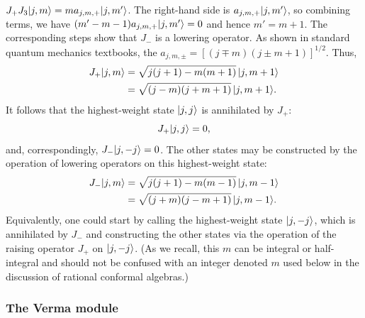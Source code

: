 $J_+J_3\lvert j,m\rangle = ma_{j,m,+}\lvert j,m'\rangle$. The right-hand side is $a_{j,m,+}\lvert j,m'\rangle$, so combining terms, we have
$(m'-m-1)a_{j,m,+}\lvert j,m'\rangle = 0$ and hence $m' = m+1$. The corresponding steps show that $J_-$ is a lowering operator.
As shown in standard quantum mechanics textbooks, the $a_{j,m,\pm} = [(j\mp m)(j\pm m+1)]^{1/2}$. Thus,
\begin{align}
  J_+\lvert j,m\rangle &= \sqrt{j(j+1)-m(m+1)}\,\lvert j,m+1\rangle \nonumber\\
               &= \sqrt{(j-m)(j+m+1)}\,\lvert j,m+1\rangle .
\end{align}
It follows that the highest-weight state $\lvert j,j\rangle$ is annihilated by $J_+$:
\begin{equation}
  J_+\lvert j,j\rangle = 0 ,
\end{equation}
and, correspondingly, $J_-\lvert j,-j\rangle = 0$. The other states may be constructed by the operation of lowering operators
on this highest-weight state:
\begin{align}
  J_-\lvert j,m\rangle &= \sqrt{j(j+1)-m(m-1)}\,\lvert j,m-1\rangle \nonumber\\
               &= \sqrt{(j+m)(j-m+1)}\,\lvert j,m-1\rangle .
\end{align}
Equivalently, one could start by calling the highest-weight state $\lvert j,-j\rangle$, which is annihilated by $J_-$ and
constructing the other states via the operation of the raising operator $J_+$ on $\lvert j,-j\rangle$. (As we recall, this $m$
can be integral or half-integral and should not be confused with an integer denoted $m$ used below in the discussion of
rational conformal algebras.)

\subsubsection*{The Verma module}

